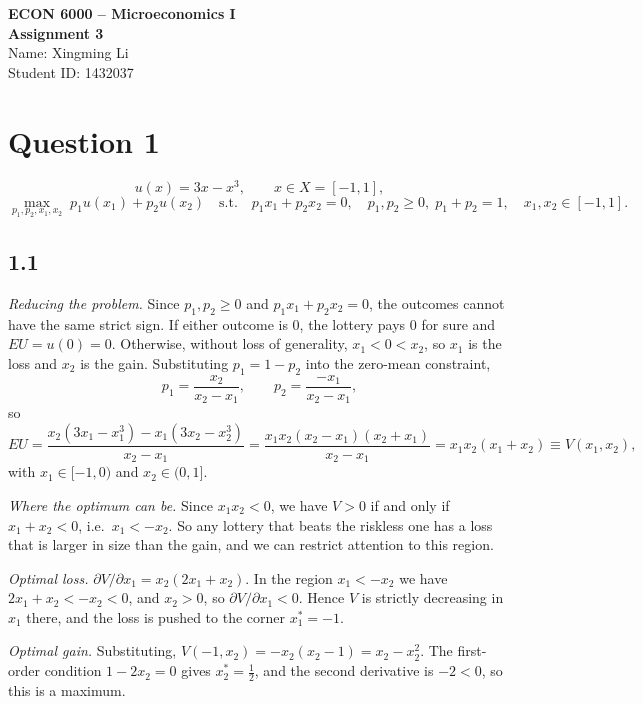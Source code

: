 \documentclass[12pt,letterpaper]{article}
\begin{document}
\begin{center}
  {\large\bfseries ECON 6000 -- Microeconomics I}\\[4pt]
  {\large\bfseries Assignment 3}\\[10pt]
  Name: Xingming Li\\
  Student ID: 1432037
\end{center}

\vspace{6pt}

\section*{Question 1}

\[
u(x) = 3x - x^3, \qquad x\in X=[-1,1],
\]
\[
\max_{p_1,p_2,x_1,x_2}\; p_1u(x_1)+p_2u(x_2)
\quad\text{s.t.}\quad p_1x_1+p_2x_2=0,\quad p_1,p_2\ge 0,\; p_1+p_2=1,\quad x_1,x_2\in[-1,1].
\]

\subsection*{1.1}

\textit{Reducing the problem.} Since $p_1,p_2\ge0$ and $p_1x_1+p_2x_2=0$, the outcomes cannot have the same strict sign. If either outcome is $0$, the lottery pays $0$ for sure and $EU=u(0)=0$. Otherwise, without loss of generality, $x_1<0<x_2$, so $x_1$ is the loss and $x_2$ is the gain. Substituting $p_1=1-p_2$ into the zero-mean constraint,
\[
p_1=\frac{x_2}{x_2-x_1},\qquad p_2=\frac{-x_1}{x_2-x_1},
\]
so
\[
EU=\frac{x_2(3x_1-x_1^3)-x_1(3x_2-x_2^3)}{x_2-x_1}
=\frac{x_1x_2(x_2-x_1)(x_2+x_1)}{x_2-x_1}
=x_1x_2(x_1+x_2)\equiv V(x_1,x_2),
\]
with $x_1\in[-1,0)$ and $x_2\in(0,1]$.

\textit{Where the optimum can be.} Since $x_1x_2<0$, we have $V>0$ if and only if $x_1+x_2<0$, i.e.\ $x_1<-x_2$. So any lottery that beats the riskless one has a loss that is larger in size than the gain, and we can restrict attention to this region.

\textit{Optimal loss.} $\partial V/\partial x_1=x_2(2x_1+x_2)$. In the region $x_1<-x_2$ we have $2x_1+x_2<-x_2<0$, and $x_2>0$, so $\partial V/\partial x_1<0$. Hence $V$ is strictly decreasing in $x_1$ there, and the loss is pushed to the corner $x_1^*=-1$.

\textit{Optimal gain.} Substituting, $V(-1,x_2)=-x_2(x_2-1)=x_2-x_2^2$. The first-order condition $1-2x_2=0$ gives $x_2^*=\tfrac12$, and the second derivative is $-2<0$, so this is a maximum.
\end{document}
